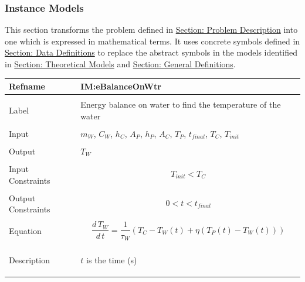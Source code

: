 \documentclass[12pt]{article}
\begin{document}
\subsubsection{Instance Models}
\label{Sec:IMs}
This section transforms the problem defined in \hyperref[Sec:ProbDesc]{Section: Problem Description} into one which is expressed in mathematical terms. It uses concrete symbols defined in \hyperref[Sec:DDs]{Section: Data Definitions} to replace the abstract symbols in the models identified in \hyperref[Sec:TMs]{Section: Theoretical Models} and \hyperref[Sec:GDs]{Section: General Definitions}.
~\newline
\noindent \begin{minipage}{\textwidth}
\begin{tabular}{p{} p{}}
\toprule \textbf{Refname} & \textbf{IM:eBalanceOnWtr}
\label{IM:eBalanceOnWtr}
\\ \midrule \\
Label & Energy balance on water to find the temperature of the water
\\ \midrule \\
Input & ${m_{W}}$, ${C_{W}}$, ${h_{C}}$, ${A_{P}}$, ${h_{P}}$, ${A_{C}}$, ${T_{P}}$, ${t_{final}}$, ${T_{C}}$, ${T_{init}}$
\\ \midrule \\
Output & ${T_{W}}$
\\ \midrule \\
Input Constraints & \begin{dmath}
                    {T_{init}}<{T_{C}}
                    \end{dmath}
\\ \midrule \\
Output Constraints & \begin{dmath}
                     0<t<{t_{final}}
                     \end{dmath}
\\ \midrule \\
Equation & \begin{dmath}
           \frac{d\,{T_{W}}}{d\,t}=\frac{1}{{τ_{W}}} \left({T_{C}}-{T_{W}}\left(t\right)+η \left({T_{P}}\left(t\right)-{T_{W}}\left(t\right)\right)\right)
           \end{dmath}
\\ \midrule \\
Description & \begin{symbDescription}
              \item{$t$ is the time (s)}

\end{symbDescription}
\end{tabular}
\end{minipage}
\end{document}
